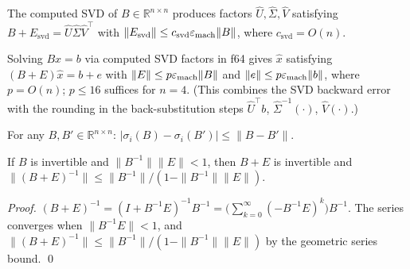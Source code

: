 \begin{unverified}
\begin{fact}\label{fact:prefilter-svd}
The computed SVD of $B \in \mathbb{R}^{n \times n}$ produces
factors $\hat{U}, \hat{\Sigma}, \hat{V}$ satisfying
$B + E_{\mathrm{svd}} = \hat{U}\hat{\Sigma}\hat{V}^\top$
with $\|E_{\mathrm{svd}}\| \le c_{\mathrm{svd}}\varepsilon_{\mathrm{mach}}\|B\|$,
where $c_{\mathrm{svd}} = O(n)$.
\end{fact}
\end{unverified}

\begin{unverified}
\begin{fact}\label{fact:prefilter-solve}
Solving $Bx = b$ via computed SVD factors in f64 gives $\hat{x}$
satisfying $(B + E)\hat{x} = b + e$ with
$\|E\| \le p\varepsilon_{\mathrm{mach}}\|B\|$ and $\|e\| \le p\varepsilon_{\mathrm{mach}}\|b\|$,
where $p = O(n)$; $p \le 16$ suffices for $n = 4$.
(This combines the SVD backward error with the rounding
in the back-substitution steps
$\hat{U}^\top b$, $\hat{\Sigma}^{-1}(\cdot)$,
$\hat{V}(\cdot)$.)
\end{fact}
\end{unverified}

\begin{unverified}
\begin{fact}\label{fact:prefilter-weyl}
For any $B, B' \in \mathbb{R}^{n \times n}$:
$|\sigma_i(B) - \sigma_i(B')| \le \|B - B'\|$.
\end{fact}
\end{unverified}

\begin{unverified}
\begin{fact}\label{fact:prefilter-banach}
If $B$ is invertible and $\|B^{-1}\|\|E\| < 1$, then
$B + E$ is invertible and
$\|(B+E)^{-1}\| \le \|B^{-1}\|/(1 - \|B^{-1}\|\|E\|)$.

\emph{Proof.}
$(B+E)^{-1} = (I + B^{-1}E)^{-1}B^{-1}
= \bigl(\sum_{k=0}^\infty (-B^{-1}E)^k\bigr)B^{-1}$.
The series converges when $\|B^{-1}E\| < 1$,
and $\|(B+E)^{-1}\| \le \|B^{-1}\|/(1 - \|B^{-1}\|\|E\|)$
by the geometric series bound. \qed
\end{fact}
\end{unverified}

